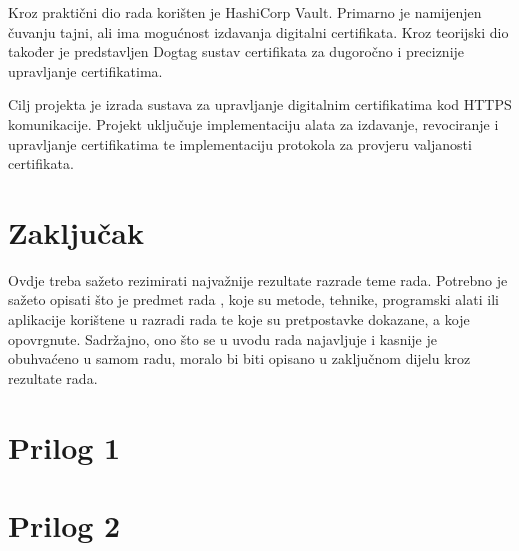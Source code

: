 \documentclass[]{foi}
\begin{document}
Kroz praktični dio rada korišten je HashiCorp Vault. 
Primarno je namijenjen čuvanju tajni, ali ima mogućnost izdavanja digitalni certifikata.
Kroz teorijski dio također je predstavljen Dogtag sustav certifikata za dugoročno i preciznije upravljanje certifikatima. 

Cilj projekta je izrada sustava za upravljanje digitalnim certifikatima kod HTTPS komunikacije. 
Projekt uključuje implementaciju alata za izdavanje, revociranje i upravljanje certifikatima te implementaciju protokola za provjeru valjanosti certifikata.

\chapter{Zaključak}

Ovdje treba sažeto rezimirati najvažnije rezultate razrade teme rada. Potrebno je sažeto opisati što je predmet rada \cite{copeland2020ArtificialIntelligence}, koje su metode, tehnike, programski alati ili aplikacije korištene u razradi rada te koje su pretpostavke dokazane, a koje opovrgnute. Sadržajno, ono što se u uvodu rada najavljuje i kasnije je obuhvaćeno u samom radu, moralo bi biti opisano u zaključnom dijelu kroz rezultate rada. 

\lipsum[1-2]

\makebackmatter

\appendices %

\chapter{Prilog 1} %

\chapter{Prilog 2} %
\end{document}
